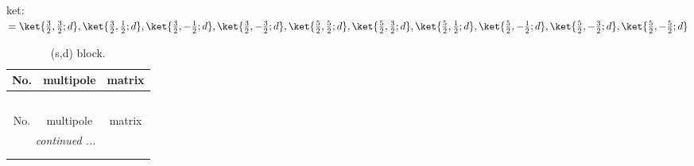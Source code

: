 \documentclass[fleqn,8pt,landscape]{jsarticle}
\begin{document}
\noindent
ket: $=\ket{\frac{3}{2},\frac{3}{2};d}, \ket{\frac{3}{2},\frac{1}{2};d}, \ket{\frac{3}{2},- \frac{1}{2};d}, \ket{\frac{3}{2},- \frac{3}{2};d}, \ket{\frac{5}{2},\frac{5}{2};d}, \ket{\frac{5}{2},\frac{3}{2};d}, \ket{\frac{5}{2},\frac{1}{2};d}, \ket{\frac{5}{2},- \frac{1}{2};d}, \ket{\frac{5}{2},- \frac{3}{2};d}, \ket{\frac{5}{2},- \frac{5}{2};d}$
\renewcommand{\arraystretch}{1.6}
\begin{longtable}{ccc}
\caption{(s,d) block.}
 \\
 \hline \hline
No. & multipole & matrix \\ \hline \endfirsthead

\multicolumn{2}{l}{\tablename\ \thetable{}} \\
 \hline \hline
No. & multipole & matrix \\ \hline \endhead

 \hline \hline
\multicolumn{2}{r}{\footnotesize\it continued ...} \\ \endfoot

 \hline \hline
\multicolumn{2}{r}{} \\ \endlastfoot


\end{longtable}
\end{document}
